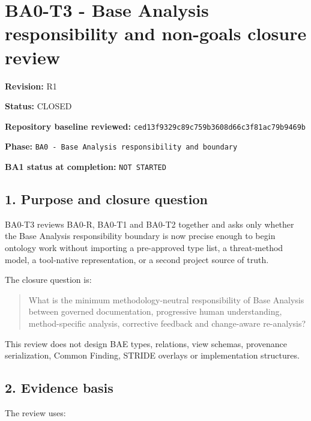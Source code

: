 \documentclass[
  10pt,
]{article}
\author{}
\date{}
\begin{document}
\section{BA0-T3 - Base Analysis responsibility and non-goals closure
review}\label{ba0-t3---base-analysis-responsibility-and-non-goals-closure-review}

\textbf{Revision:} R1

\textbf{Status:} CLOSED

\textbf{Repository baseline reviewed:}
\texttt{ced13f9329c89c759b3608d66c3f81ac79b9469b}

\textbf{Phase:}
\texttt{BA0\ -\ Base\ Analysis\ responsibility\ and\ boundary}

\textbf{BA1 status at completion:} \texttt{NOT\ STARTED}

\subsection{1. Purpose and closure
question}\label{purpose-and-closure-question}

BA0-T3 reviews BA0-R, BA0-T1 and BA0-T2 together and asks only whether
the Base Analysis responsibility boundary is now precise enough to begin
ontology work without importing a pre-approved type list, a
threat-method model, a tool-native representation, or a second project
source of truth.

The closure question is:

\begin{quote}
What is the minimum methodology-neutral responsibility of Base Analysis
between governed documentation, progressive human understanding,
method-specific analysis, corrective feedback and change-aware
re-analysis?
\end{quote}

This review does not design BAE types, relations, view schemas,
provenance serialization, Common Finding, STRIDE overlays or
implementation structures.

\subsection{2. Evidence basis}\label{evidence-basis}

The review uses:
\end{document}

